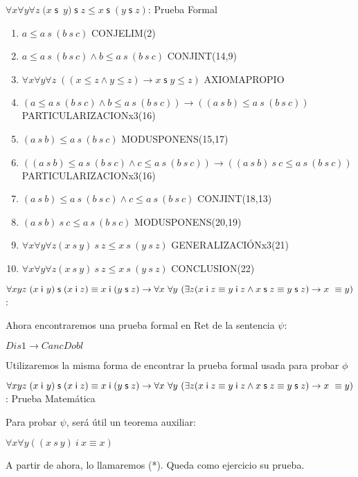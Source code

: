 \documentclass[10pt]{beamer}
\newcounter{saveenumi}
\newcommand{\seti}{\setcounter{saveenumi}{\value{enumi}}}
\newcommand{\conti}{\setcounter{enumi}{\value{saveenumi}}}
\newcommand{\Cfontb}{\fontsize{5.7}{9.5}\selectfont}
\newcommand{\Cfonti}{\fontsize{8.5}{7.2}\selectfont}
\newcommand{\Nand}{\wedge}
\newcommand{\sLesCot}{\forall x\forall y\forall z\;\left( (x\leq
z\wedge y\leq z)\rightarrow x\;\text{$\mathsf{s\;}$}y\leq z\right)}
\newcommand{\assoc}{\forall x\forall y\forall
z\;(x\;\mathsf{s}$\ $y)\;\mathsf{s}\;z\leq x\;\mathsf{s}\;(y\;\mathsf{s}\;z)}
\newcommand{\acot}{Dis1\rightarrow CancDobl}
\newcommand{\idistr}{\forall xyz\;(x\;\mathsf{i}\
y)\;\mathsf{s}\;(x\;\mathsf{i}\;z)\equiv x\;\mathsf{i}\;(y\;\mathsf{s}%
\;z)}
\newcommand{\myconj}{x\;\mathsf{i}\;z\equiv y\;\mathsf{%
i}\;z\wedge x\;\mathsf{s}\;z\equiv y\;\mathsf{s}\;z}
\begin{document}
\begin{frame}{$\assoc$: Prueba Formal}
\Cfontb

\begin{enumerate}[<+->]
  \conti
  \item $ a \leq a\ s\ (b\ s\ c)$ \hfill CONJELIM(2)

  \item $ a \leq a\ s\ (b\ s\ c) \Nand b \leq a\ s\ (b\ s\ c)$ \hfill CONJINT(14,9)
  \item $ \sLesCot $ \hfill AXIOMAPROPIO
  \item $ (a \leq a\ s\ (b\ s\ c) \Nand b \leq a\ s\ (b\ s\ c)) \rightarrow ((a\ s\ b) \leq a\ s\ (b\ s\ c)) $ \hfill PARTICULARIZACIONx3(16)
  \item $ (a\ s\ b) \leq a\ s\ (b\ s\ c)$ \hfill MODUSPONENS(15,17)

  \item $ ((a\ s\ b) \leq a\ s\ (b\ s\ c) \Nand c \leq a\ s\ (b\ s\ c)) \rightarrow ((a\ s\ b)\ s\ c \leq a\ s\ (b\ s\ c)) $ \hfill PARTICULARIZACIONx3(16)
  \item $ (a\ s\ b) \leq a\ s\ (b\ s\ c) \Nand c \leq a\ s\ (b\ s\ c) $ \hfill CONJINT(18,13)
  \item $ (a\ s\ b)\ s\ c \leq a\ s\ (b\ s\ c) $ \hfill MODUSPONENS(20,19)
  \item $ \forall x \forall y \forall z (x\ s\ y)\ s\ z \leq x\ s\ (y\ s\ z)$ \hfill GENERALIZACIÓNx3(21)
  \item $ \forall x \forall y \forall z (x\ s\ y)\ s\ z \leq x\ s\ (y\ s\ z)$ \hfill CONCLUSION(22)
  \seti
\end{enumerate}

\end{frame}



\begin{frame}{\Cfonti$\idistr \rightarrow \forall x\ \forall y\ (\exists z (\myconj) \rightarrow x\ \equiv y)$:}

  Ahora encontraremos una prueba formal en Ret de la sentencia $\psi$:
  \begin{center}
    $\acot$
  \end{center}
  \pause
  Utilizaremos la misma forma de encontrar la prueba formal usada para probar
  $\phi$

\end{frame}


\begin{frame}{\Cfonti$\idistr \rightarrow \forall x\ \forall y\ (\exists z (\myconj) \rightarrow x\ \equiv y)$: Prueba Matemática}

  Para probar $\psi$, será útil un teorema auxiliar:
  \begin{center}
    $\forall x \forall y ((x\ s\ y)\ i\ x \equiv x)$
  \end{center}
  A partir de ahora, lo llamaremos (*). Queda como ejercicio su prueba.

\end{frame}
\end{document}
